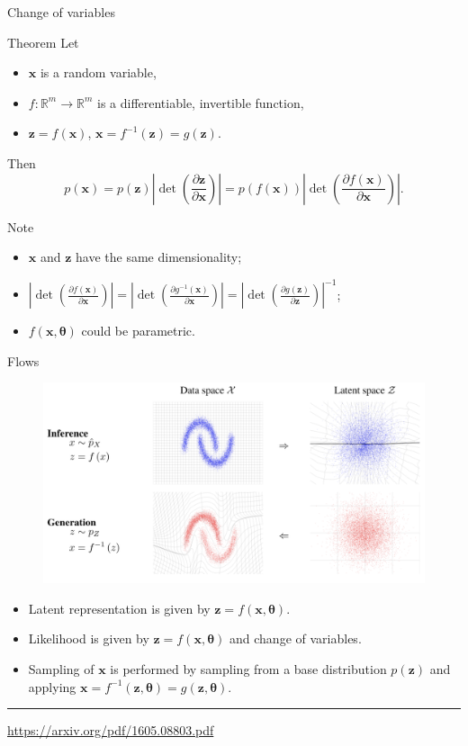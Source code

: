 \documentclass{beamer}
\newcommand{\bx}{\mathbf{x}}
\newcommand{\bz}{\mathbf{z}}
\newcommand{\btheta}{\boldsymbol{\theta}}
\begin{document}
\begin{frame}{Change of variables}
	\begin{block}{Theorem}
		Let 
		\begin{itemize}
			\item $\bx$ is a random variable, 
			\item $f: \mathbb{R}^m \rightarrow \mathbb{R}^m$ is a differentiable, invertible function,
			\item $\bz = f(\bx)$, $\bx = f^{-1}(\bz) = g(\bz)$.
		\end{itemize}
		Then
		\[
		p(\bx) = p(\bz) \left|\det \left(  \frac{\partial \bz}{\partial \bx} \right) \right| = p(f(\bx)) \left|\det \left(  \frac{\partial f(\bx)}{\partial \bx} \right) \right|.
		\]
	\end{block}
	\begin{block}{Note}
		\begin{itemize}
			\item $\bx$ and $\bz$ have the same dimensionality;
			\item $ \left|\det \left(  \frac{\partial f(\bx)}{\partial \bx} \right)\right| = \left|\det \left(  \frac{\partial g^{-1}(\bx)}{\partial \bx} \right)\right| = \left|\det \left(  \frac{\partial g(\bz)}{\partial \bz} \right)\right|^{-1}$;
			\item $f(\bx, \btheta)$ could be parametric.
		\end{itemize}
	\end{block}
\end{frame}
\begin{frame}{Flows}
\begin{figure}
	\includegraphics[width=0.8\linewidth]{figs/flows_how2.png}
\end{figure}
\begin{itemize}	
	\item Latent representation is given by $\bz = f(\bx, \btheta)$.
	\item Likelihood is given by $\bz = f(\bx, \btheta)$ and change of variables.
	\item Sampling of $\bx$ is performed by sampling from a base distribution $p(\bz)$ and applying $\bx = f^{-1}(\bz, \btheta) = g(\bz, \btheta)$.
\end{itemize}
\vfill
\hrule\medskip
{\scriptsize \href{https://arxiv.org/pdf/1605.08803.pdf}{https://arxiv.org/pdf/1605.08803.pdf}} 
\end{frame}
\end{document}
